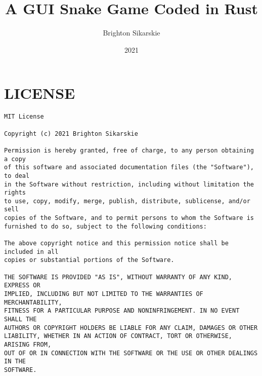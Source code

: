 \documentclass{article}
\begin{document}
\title{A GUI Snake Game Coded in Rust}
\author{Brighton Sikarskie}
\date{2021}
\maketitle

\section{LICENSE}
\begin{verbatim}
MIT License

Copyright (c) 2021 Brighton Sikarskie

Permission is hereby granted, free of charge, to any person obtaining a copy
of this software and associated documentation files (the "Software"), to deal
in the Software without restriction, including without limitation the rights
to use, copy, modify, merge, publish, distribute, sublicense, and/or sell
copies of the Software, and to permit persons to whom the Software is
furnished to do so, subject to the following conditions:

The above copyright notice and this permission notice shall be included in all
copies or substantial portions of the Software.

THE SOFTWARE IS PROVIDED "AS IS", WITHOUT WARRANTY OF ANY KIND, EXPRESS OR
IMPLIED, INCLUDING BUT NOT LIMITED TO THE WARRANTIES OF MERCHANTABILITY,
FITNESS FOR A PARTICULAR PURPOSE AND NONINFRINGEMENT. IN NO EVENT SHALL THE
AUTHORS OR COPYRIGHT HOLDERS BE LIABLE FOR ANY CLAIM, DAMAGES OR OTHER
LIABILITY, WHETHER IN AN ACTION OF CONTRACT, TORT OR OTHERWISE, ARISING FROM,
OUT OF OR IN CONNECTION WITH THE SOFTWARE OR THE USE OR OTHER DEALINGS IN THE
SOFTWARE.
\end{verbatim}
\end{document}
